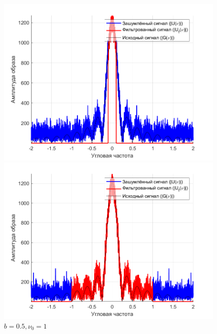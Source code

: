 \documentclass[a4paper]{article}
\begin{document}
\begin{figure}[H]
    \begin{minipage}{0.5\textwidth}
        \centering
        \includegraphics[width=\textwidth]{part1/0.5_0.1_Fourier.png}
        \caption{$b=0.5, \nu_0 = 0.1$}
    \end{minipage}    
    \begin{minipage}{0.5\textwidth}
        \centering
        \includegraphics[width=\textwidth]{part1/0.5_1_Fourier.png}
        \caption{$b=0.5, \nu_0 = 1$}
    \end{minipage}
\end{figure}\ 
\end{document}
